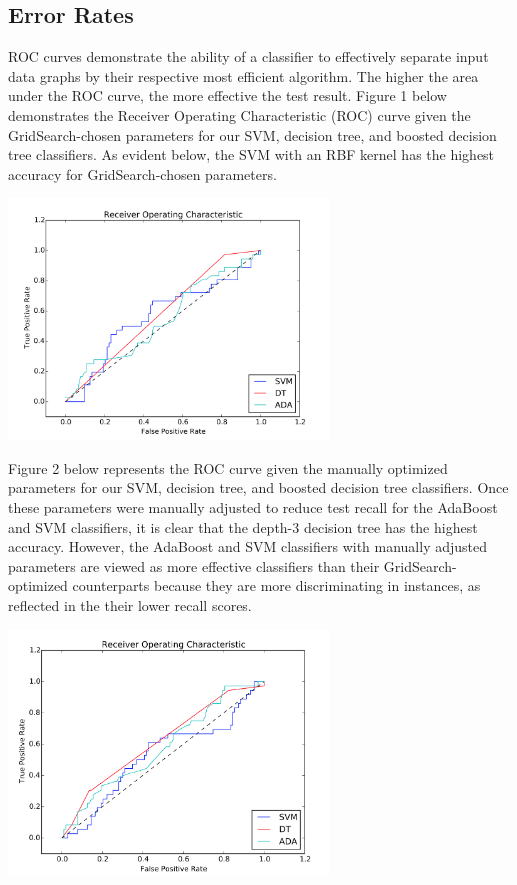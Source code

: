 \documentclass{article}
\begin{document}
\subsection{Error Rates}

ROC curves demonstrate the ability of a classifier to effectively separate input data graphs by their respective most efficient algorithm. The higher the area under the ROC curve, the more effective the test result. Figure 1 below demonstrates the Receiver Operating Characteristic (ROC) curve given the GridSearch-chosen parameters for our SVM, decision tree, and boosted decision tree classifiers. As evident below, the SVM with an RBF kernel has the highest accuracy for GridSearch-chosen parameters.

\includegraphics[width=8.5cm]{ROC}

Figure 2 below represents the ROC curve given the manually optimized parameters for our SVM, decision tree, and boosted decision tree classifiers. Once these parameters were manually adjusted to reduce test recall for the AdaBoost and SVM classifiers, it is clear that the depth-3 decision tree has the highest accuracy. However, the AdaBoost and SVM classifiers with manually adjusted parameters are viewed as more effective classifiers than their GridSearch-optimized counterparts because they are more discriminating in instances, as reflected in the their lower recall scores.

\includegraphics[width=8.5cm]{ROC2}
\end{document}
